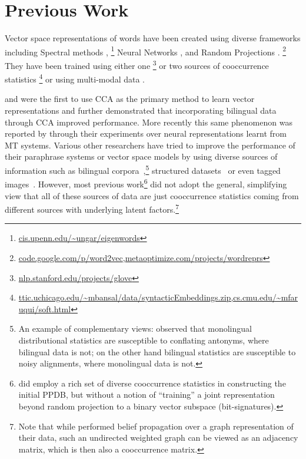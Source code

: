 \documentclass[11pt]{article}
\begin{document}
\section{Previous Work}
\label{sec:previouswork}
Vector space representations of words have been created using diverse
 frameworks including Spectral methods
 \cite{dhillon2011multi,dhillon2012two},
 \footnote{\url{cis.upenn.edu/~ungar/eigenwords}}
 Neural Networks
 \cite{mikolov2013linguistic,collobert2013word}, and Random Projections \cite{ravichandranACL05,bhagatACL08,chanGEMS2011}.
 \footnote{\url{code.google.com/p/word2vec},\url{metaoptimize.com/projects/wordreprs}}
 They have been trained using either one
 \cite{pennington2014glove}
 \footnote{\url{nlp.stanford.edu/projects/glove}}
 or two sources of cooccurrence statistics
 \cite{zou2013bilingual,faruqui2014improving,bansal2014tailoring,levy2014dependency}
 \footnote{\url{ttic.uchicago.edu/~mbansal/data/syntacticEmbeddings.zip,cs.cmu.edu/~mfaruqui/soft.html}}
 or using multi-modal data
 \cite{felix2014learning,bruni2012distributional}.

 and  were the first to use
CCA as the primary method to learn vector representations and
 further demonstrated that incorporating bilingual
data through CCA improved performance. More recently this same
phenomenon was reported by  through their
experiments over neural representations learnt from MT systems.
Various other researchers have tried to improve the performance of
their paraphrase systems or vector space models by using diverse
sources of information such as bilingual
corpora~\cite{bannard2005paraphrasing,Huang2012Improving,zou2013bilingual},\footnote{An
  example of complementary views:  observed that
  monolingual distributional statistics are susceptible to conflating
  antonyms, where bilingual data is not; on the other hand bilingual
  statistics are susceptible to noisy alignments, where monolingual
  data is not.}  structured
datasets~\cite{yu2014improving,faruqui2014retrofitting} or even tagged
images~\cite{bruni2012distributional}. However, most previous
work\footnote{ did employ a rich set of
  diverse cooccurrence statistics in constructing the initial PPDB, but without a notion of
  ``training'' a joint representation beyond random projection to a binary
  vector subspace (bit-signatures).} did not adopt the general,
simplifying view that all of these sources of data are just
cooccurrence statistics coming from different sources with underlying
latent factors.\footnote{Note that while
   performed belief propagation over
  a graph representation of their data, such an undirected weighted
  graph can be viewed as an adjacency matrix, which is then also a
  cooccurrence matrix.}
\end{document}
